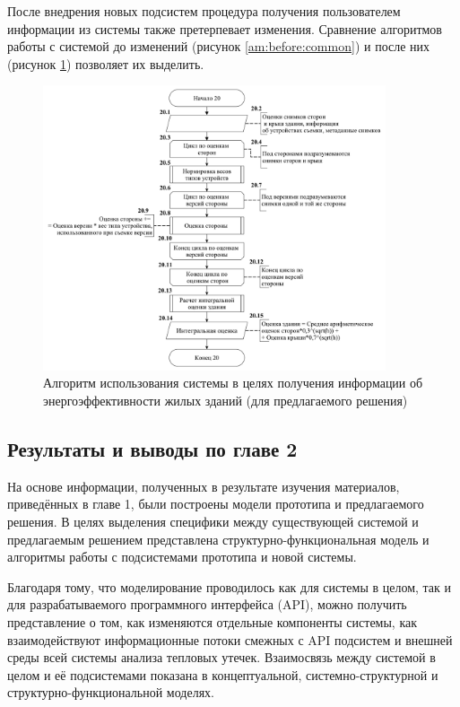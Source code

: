 \pagebreak

\par
	После внедрения новых подсистем процедура получения пользователем информации из системы также претерпевает изменения. Сравнение алгоритмов работы с системой до изменений (рисунок \ref{am:before:common}) и после них (рисунок \ref{am:after:common}) позволяет их выделить.

	\begin{figure}[t!]
      \centering
      \includegraphics[width=0.9\textwidth]{images/am/am02_after}
      \caption{Алгоритм использования системы в целях получения информации об энергоэффективности жилых зданий (для предлагаемого решения)}
      \label{am:after:common}
    \end{figure}

\pagebreak

\subsection{Результаты и выводы по главе 2}
\label{sec:models:summary}

\par
	На основе информации, полученных в результате изучения материалов, приведённых в главе 1, были построены модели прототипа и предлагаемого решения. В целях выделения специфики между существующей системой и предлагаемым решением представлена структурно-функциональная модель и алгоритмы работы с подсистемами прототипа и новой системы.

	Благодаря тому, что моделирование проводилось как для системы в целом, так и для разрабатываемого программного интерфейса (API), можно получить представление о том, как изменяются отдельные компоненты системы, как взаимодействуют информационные потоки смежных с API подсистем и внешней среды всей системы анализа тепловых утечек. Взаимосвязь между системой в целом и её подсистемами показана в концептуальной, системно-структурной и структурно-функциональной моделях.

